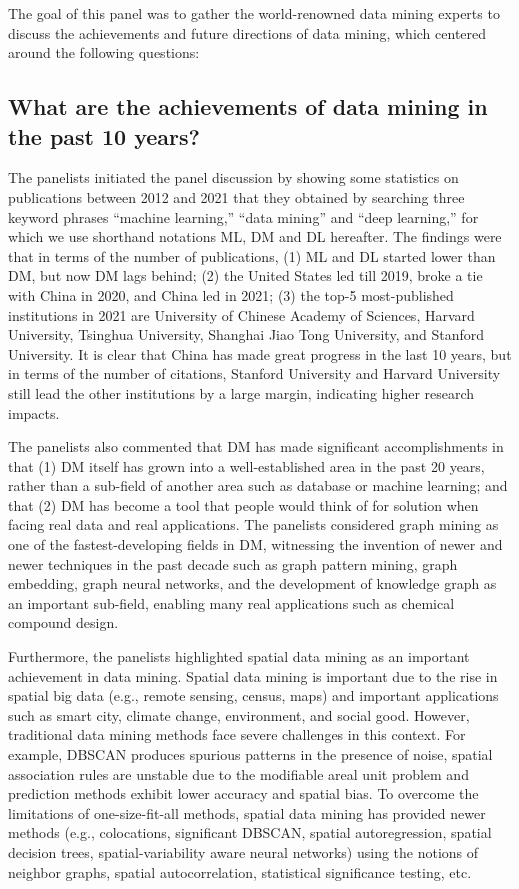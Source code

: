 \documentclass[11pt,dvipdfm]{article}
\begin{document}
The goal of this panel was to gather the world-renowned data mining experts to discuss the achievements and future directions of data mining, which centered around the following questions:

\subsection{What are the achievements of data mining in the past 10 years?}

The panelists initiated the panel discussion by showing some statistics on publications between 2012 and 2021 that they obtained by searching three keyword phrases “machine learning,” “data mining” and “deep learning,” for which we use shorthand notations ML, DM and DL hereafter. The findings were that in terms of the number of publications, (1) ML and DL started lower than DM, but now DM lags behind; (2) the United States led till 2019, broke a tie with China in 2020, and China led in 2021; (3) the top-5 most-published institutions in 2021 are University of Chinese Academy of Sciences, Harvard University, Tsinghua University, Shanghai Jiao Tong University, and Stanford University. It is clear that China has made great progress in the last 10 years, but in terms of the number of citations, Stanford University and Harvard University still lead the other institutions by a large margin, indicating higher research impacts.

The panelists also commented that DM has made significant accomplishments in that (1) DM itself has grown into a well-established area in the past 20 years, rather than a sub-field of another area such as database or machine learning; and that (2) DM has become a tool that people would think of for solution when facing real data and real applications. The panelists considered graph mining as one of the fastest-developing fields in DM, witnessing the invention of newer and newer techniques in the past decade such as graph pattern mining, graph embedding, graph neural networks, and the development of knowledge graph as an important sub-field, enabling many real applications such as chemical compound design.

Furthermore, the panelists highlighted spatial data mining as an important achievement in data mining. Spatial data mining is important due to the rise in spatial big data (e.g., remote sensing, census, maps) and important applications such as smart city, climate change, environment, and social good.  However, traditional data mining methods face severe challenges in this context. For example, DBSCAN produces spurious patterns in the presence of noise, spatial association rules are unstable due to the modifiable areal unit problem and prediction methods exhibit lower accuracy and spatial bias. To overcome the limitations of one-size-fit-all methods, spatial data mining has provided newer methods (e.g., colocations, significant DBSCAN, spatial autoregression, spatial decision trees, spatial-variability aware neural networks) using the notions of neighbor graphs, spatial autocorrelation, statistical significance testing, etc. 
\end{document}
